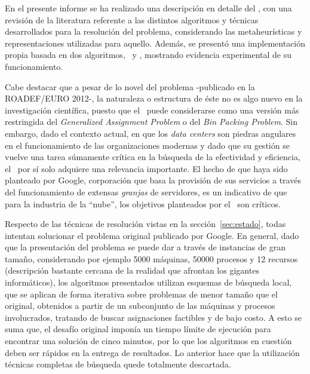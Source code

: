 \documentclass[../informe2.tex]{subfiles}
\begin{document}
En el presente informe se ha realizado una descripción en detalle del \mrp, con una revisión de la literatura referente a las distintos algoritmos y técnicas desarrollados para la resolución del problema, considerando las metaheurísticas y representaciones utilizadas para aquello. Además, se presentó una implementación propia basada en dos algoritmos, \greedy\ y \hillc, mostrando evidencia experimental de su funcionamiento. \par
\noindent Cabe destacar que a pesar de lo novel del problema -publicado en la ROADEF/EURO 2012-, la naturaleza o estructura de éste no es algo nuevo en la investigación científica, puesto que el \mrp\  puede considerarse como una versión más restringida del \textit{Generalized Assignment Problem} o del \textit{Bin Packing Problem}. Sin embargo, dado el contexto actual, en que los \textit{data centers} son piedras angulares en el funcionamiento de las organizaciones modernas y dado que su gestión se vuelve una tarea súmamente crítica en la búsqueda de la efectividad y eficiencia, el \mrp\ por sí solo adquiere una relevancia importante. El hecho de que haya sido planteado por Google, corporación que basa la provisión de sus servicios a través del funcionamiento de extensas \textit{granjas} de servidores, es un indicativo de que para la industria de la ``nube'', los objetivos planteados por el  \mrp\ son críticos. \par
\noindent Respecto de las técnicas de resolución vistas en la sección~\ref{sec:estado}, todas intentan solucionar el problema original publicado por Google. En general, dado que la presentación del problema se puede dar a través de instancias de gran tamaño, considerando por ejemplo 5000 máquinas, 50000 procesos y 12 recursos (descripción bastante cercana de la realidad que afrontan los gigantes informáticos), los algoritmos presentados utilizan esquemas de búsqueda local, que se aplican de forma iterativa sobre problemas de menor tamaño que el original, obtenidos a partir de un subconjunto de las máquinas y procesos involucrados, tratando de buscar asignaciones factibles y de bajo costo. A esto se suma que, el desafío original imponía un tiempo límite de ejecución para encontrar una solución de cinco minutos, por lo que los algoritmos en cuestión deben ser rápidos en la entrega de resultados. Lo anterior hace que la utilización técnicas completas de búsqueda quede totalmente descartada. \par
\end{document}
